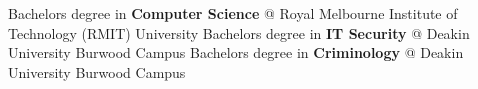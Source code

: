 
\begin{scholarship}
					{Bachelors degree in \textbf{Computer Science} @ Royal Melbourne Institute of Technology (RMIT) University }
					{Bachelors degree in \textbf{IT Security} @ Deakin University Burwood Campus}
					{Bachelors degree in \textbf{Criminology} @ Deakin University Burwood Campus}
\end{scholarship}